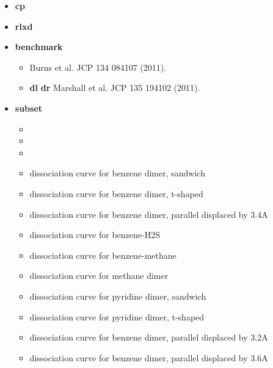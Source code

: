 \documentclass[letterpaper,10pt,english]{sphinxmanual}
\begin{document}
\begin{itemize}
\item {} 
\textbf{cp}   \textbar{}\textbar{} 

\item {} 
\textbf{rlxd} 

\item {} 
\textbf{benchmark}
\begin{itemize}
\item {} 
 Burns et al. JCP 134 084107 (2011).

\item {} 
{\color{red}\bfseries{}\textbar{}dl\textbar{}}  {\color{red}\bfseries{}\textbar{}dr\textbar{}} Marshall et al. JCP 135 194102 (2011).

\end{itemize}

\item {} 
\textbf{subset}
\begin{itemize}
\item {} 

\item {} 

\item {} 

\item {} 
 dissociation curve for benzene dimer, sandwich

\item {} 
 dissociation curve for benzene dimer, t-shaped

\item {} 
 dissociation curve for benzene dimer, parallel displaced by 3.4A

\item {} 
 dissociation curve for benzene-H2S

\item {} 
 dissociation curve for benzene-methane

\item {} 
 dissociation curve for methane dimer

\item {} 
 dissociation curve for pyridine dimer, sandwich

\item {} 
 dissociation curve for pyridine dimer, t-shaped

\item {} 
 dissociation curve for benzene dimer, parallel displaced by 3.2A

\item {} 
 dissociation curve for benzene dimer, parallel displaced by 3.6A

\end{itemize}

\end{itemize}
\end{document}
